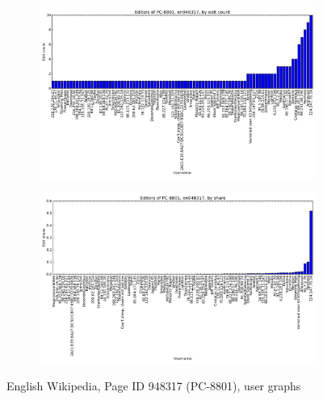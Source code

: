 \begin{figure}
   \centering
    \begin{subfigure}[b]{0.8\linewidth}
      \centering
      \includegraphics[width=\linewidth]{img/editshare/pc8801count.png}
    \end{subfigure}
    \newline
    \begin{subfigure}[b]{0.8\linewidth}
      \centering
      \includegraphics[width=\linewidth]{img/editshare/pc8801share.png}
    \end{subfigure}
    \caption{English Wikipedia, Page ID 948317 (PC-8801), user graphs}
\end{figure}
